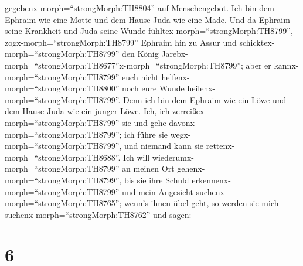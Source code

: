 gegebenx-morph=``strongMorph:TH8804'' auf Menschengebot. 
Ich bin dem Ephraim wie eine Motte und dem Hause Juda wie eine Made.
 Und da Ephraim seine Krankheit und Juda seine Wunde
fühltex-morph=``strongMorph:TH8799'', zogx-morph=``strongMorph:TH8799''
Ephraim hin zu Assur und schicktex-morph=``strongMorph:TH8799'' den
König Jarebx-morph=``strongMorph:TH8677''x-morph=``strongMorph:TH8799'';
aber er kannx-morph=``strongMorph:TH8799'' euch nicht
helfenx-morph=``strongMorph:TH8800'' noch eure Wunde
heilenx-morph=``strongMorph:TH8799''.  Denn ich bin dem
Ephraim wie ein Löwe und dem Hause Juda wie ein junger Löwe. Ich, ich
zerreißex-morph=``strongMorph:TH8799'' sie und gehe
davonx-morph=``strongMorph:TH8799''; ich führe sie
wegx-morph=``strongMorph:TH8799'', und niemand kann sie
rettenx-morph=``strongMorph:TH8688''.  Ich will
wiederumx-morph=``strongMorph:TH8799'' an meinen Ort
gehenx-morph=``strongMorph:TH8799'', bis sie ihre Schuld
erkennenx-morph=``strongMorph:TH8799'' und mein Angesicht
suchenx-morph=``strongMorph:TH8765''; wenn's ihnen übel geht, so werden
sie mich suchenx-morph=``strongMorph:TH8762'' und sagen:

\hypertarget{section-5}{%
\section{6}\label{section-5}}

